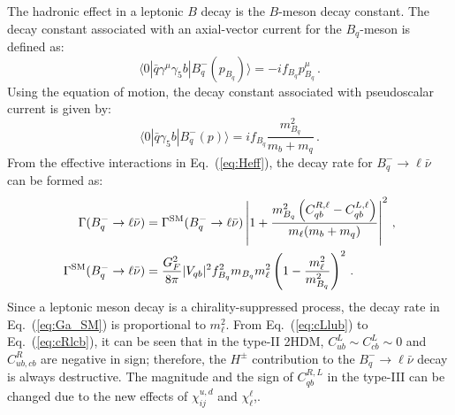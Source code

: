 \documentclass[prd,preprint,superscriptaddress,amsmath,amssymb]{revtex4}
\begin{document}
The hadronic effect in a leptonic $B$ decay is the $B$-meson decay constant. The decay constant associated with an axial-vector current  for the  $B_q$-meson  is defined as:
 \begin{equation}
 \langle 0 | \bar q \gamma^\mu \gamma_5 b|  B^-_q (p_{B_q}) \rangle = -i f_{B_q} p^\mu_{B_q} \,.
 \end{equation}
Using the equation of motion, the decay constant associated with pseudoscalar current is given by:
 \begin{equation}
 \langle 0| \bar q \gamma_5 b | B^-_q(p) \rangle = i f_{B_q} \frac{m^2_{B_q} }{m_b + m_q }\,. 
 \end{equation}
 From the effective interactions in Eq.~(\ref{eq:Heff}), the decay rate for $B^-_q \to \ell \bar\nu$ can be formed as:
 \begin{align}
 \Gamma(B^-_q \to \ell \bar\nu) &= \Gamma^{\rm SM}(B^-_q \to \ell \bar\nu)  \left| 1 + \frac{m^2_{B_q} \left( C^{R,\ell}_{qb} - C^{L,\ell}_{qb} \right)}{m_\ell (m_b + m_q)}\right|^2\,, \label{eq:GaBqellnu} \\
 \Gamma^{\rm SM}(B^-_q \to \ell \bar\nu) &= \frac{G^2_F}{8\pi} |V_{qb}|^2 f^2_{B_q} m_{B_q} m^2_\ell \left( 1- \frac{m^2_\ell}{m^2_{B_q}}\right)^2 \,. \label{eq:Ga_SM}
 \end{align}
 Since  a leptonic meson decay is a chirality-suppressed process,  the decay rate in Eq.~(\ref{eq:Ga_SM}) is proportional to $m^2_\ell$.  From Eq.~(\ref{eq:cLlub}) to Eq.~(\ref{eq:cRlcb}), it can be seen that in the type-II 2HDM, $C^L_{ub} \sim C^L_{cb} \sim 0$ and $C^R_{ub, cb}$ are negative in sign;  therefore, the $H^\pm$ contribution to the $B^-_q \to \ell \bar\nu$ decay is always destructive.  The magnitude and the sign of $C^{R,L}_{qb}$ in the type-III can be changed due to the new effects of  $\chi^{u,d}_{ij}$ and $\chi^\ell_{\ell}$,. 
 
\end{document}
